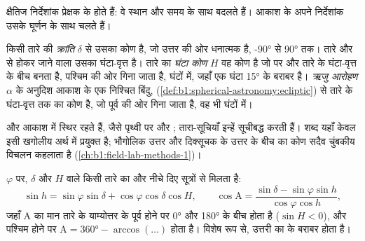 क्षैतिज निर्देशांक प्रेक्षक के होते हैं: वे स्थान और समय के साथ बदलते हैं। आकाश के अपने
निर्देशांक उसके घूर्णन के साथ चलते हैं।

\begin{definition}[विषुवतीय निर्देशांक]\label{def:b1:spherical-astronomy:equatorial}
किसी तारे की \emph{क्रांति} $\delta$  से उसका कोण
है, जो उत्तर की ओर धनात्मक है, \ang{-90} से \ang{90} तक। तारे और  से होकर
जाने वाला  उसका घंटा-वृत्त है। तारे का \emph{घंटा कोण}
$H$ वह कोण है जो  पर  और तारे के घंटा-वृत्त के बीच बनता है,
पश्चिम की ओर गिना जाता है, घंटों में, जहाँ एक घंटा \ang{15} के बराबर है। \emph{ऋजु
आरोहण} $\alpha$  के अनुदिश आकाश के एक निश्चित बिंदु,
 (\cref{def:b1:spherical-astronomy:ecliptic}) से तारे के घंटा-वृत्त तक का
कोण है, जो पूर्व की ओर गिना जाता है, वह भी घंटों में।
\end{definition}

 और  आकाश में स्थिर रहते हैं, जैसे पृथ्वी पर  और ; तारा-सूचियाँ
इन्हें सूचीबद्ध करती हैं।  शब्द यहाँ केवल इसी खगोलीय अर्थ में प्रयुक्त है; भौगोलिक
उत्तर और दिक्सूचक के उत्तर के बीच का कोण सदैव चुंबकीय विचलन
कहलाता है (\cref{ch:b1:field-lab-methods-1})।

\begin{proposition}[विषुवतीय से क्षैतिज निर्देशांक]\label{prop:b1:spherical-astronomy:transform}
 $\varphi$ पर,  $\delta$ और  $H$ वाले किसी तारे का  और 
नीचे दिए सूत्रों से मिलता है:
\[
  \sin h = \sin\varphi\sin\delta + \cos\varphi\cos\delta\cos H,
  \qquad
  \cos\mathrm{A} = \frac{\sin\delta - \sin\varphi\sin h}{\cos\varphi\cos h},
\]
जहाँ $\mathrm{A}$ का मान तारे के याम्योत्तर के पूर्व होने पर \ang{0} और \ang{180} के बीच
होता है ($\sin H < 0$), और पश्चिम होने पर $\mathrm{A} = \ang{360} - \arccos(\dots)$ होता है।
विशेष रूप से, उत्तरी  का   के बराबर होता है।
\end{proposition}


